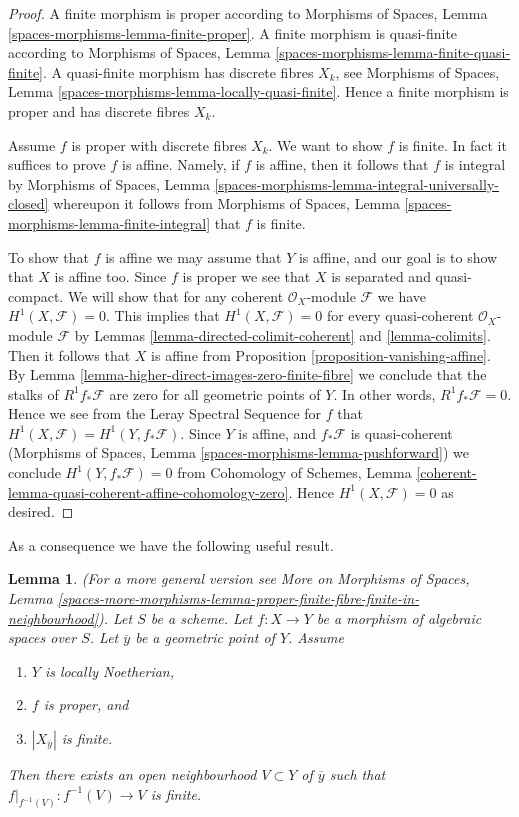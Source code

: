 \documentclass{stacks-project}
\theoremstyle{plain}
\newtheorem{lemma}[subsection]{Lemma}
\theoremstyle{definition}
\theoremstyle{remark}
\numberwithin{equation}{subsection}
\begin{document}
\begin{proof}
A finite morphism is proper according to
Morphisms of Spaces, Lemma \ref{spaces-morphisms-lemma-finite-proper}.
A finite morphism is quasi-finite according to
Morphisms of Spaces, Lemma \ref{spaces-morphisms-lemma-finite-quasi-finite}.
A quasi-finite morphism has discrete fibres $X_k$, see
Morphisms of Spaces, Lemma \ref{spaces-morphisms-lemma-locally-quasi-finite}.
Hence a finite morphism is proper and has discrete fibres $X_k$.

\medskip\noindent
Assume $f$ is proper with discrete fibres $X_k$.
We want to show $f$ is finite.
In fact it suffices to prove $f$ is affine.
Namely, if $f$ is affine, then it follows that
$f$ is integral by
Morphisms of Spaces, Lemma
\ref{spaces-morphisms-lemma-integral-universally-closed}
whereupon it follows from
Morphisms of Spaces, Lemma \ref{spaces-morphisms-lemma-finite-integral}
that $f$ is finite.

\medskip\noindent
To show that $f$ is affine we may assume that $Y$ is affine, and our
goal is to show that $X$ is affine too.
Since $f$ is proper we see that $X$ is separated and quasi-compact.
We will show that for any coherent
$\mathcal{O}_X$-module $\mathcal{F}$ we have $H^1(X, \mathcal{F}) = 0$.
This implies that $H^1(X, \mathcal{F}) = 0$ for every quasi-coherent
$\mathcal{O}_X$-module $\mathcal{F}$ by
Lemmas \ref{lemma-directed-colimit-coherent} and \ref{lemma-colimits}.
Then it follows that $X$ is affine from
Proposition \ref{proposition-vanishing-affine}. By
Lemma \ref{lemma-higher-direct-images-zero-finite-fibre}
we conclude that the stalks of $R^1f_*\mathcal{F}$
are zero for all geometric points of $Y$.
In other words, $R^1f_*\mathcal{F} = 0$. Hence we see from
the Leray Spectral Sequence for $f$ that
$H^1(X , \mathcal{F}) = H^1(Y, f_*\mathcal{F})$.
Since $Y$ is affine, and $f_*\mathcal{F}$ is quasi-coherent
(Morphisms of Spaces, Lemma \ref{spaces-morphisms-lemma-pushforward})
we conclude $H^1(Y, f_*\mathcal{F}) = 0$
from
Cohomology of Schemes, Lemma
\ref{coherent-lemma-quasi-coherent-affine-cohomology-zero}.
Hence $H^1(X, \mathcal{F}) = 0$ as desired.
\end{proof}

\noindent
As a consequence we have the following useful result.

\begin{lemma}
\label{lemma-proper-finite-fibre-finite-in-neighbourhood}
(For a more general version see
More on Morphisms of Spaces, Lemma
\ref{spaces-more-morphisms-lemma-proper-finite-fibre-finite-in-neighbourhood}).
Let $S$ be a scheme. Let $f : X \to Y$ be a morphism of algebraic spaces
over $S$. Let $\overline{y}$ be a geometric point of $Y$.
Assume
\begin{enumerate}
\item $Y$ is locally Noetherian,
\item $f$ is proper, and
\item $|X_{\overline{y}}|$ is finite.
\end{enumerate}
Then there exists an open neighbourhood $V \subset Y$ of $\overline{y}$
such that $f|_{f^{-1}(V)} : f^{-1}(V) \to V$ is finite.
\end{lemma}
\end{document}
